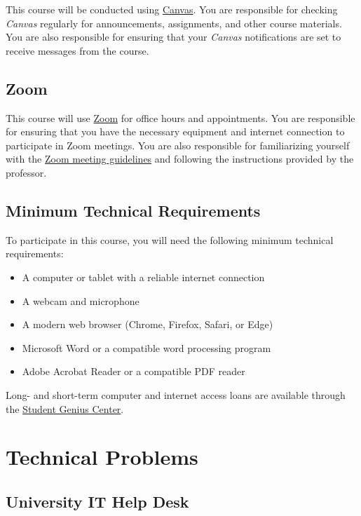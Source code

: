 \documentclass[11pt, letterpaper]{article}
\begin{document}
This course will be conducted using \href{https://csufullerton.instructure.com/}{Canvas}. You are responsible for checking \emph{Canvas} regularly for announcements, assignments, and other course materials. You are also responsible for ensuring that your \emph{Canvas} notifications are set to receive messages from the course. 

\subsection*{Zoom}
This course will use \href{https://fullerton.zoom.us/}{Zoom} for office hours and appointments. You are responsible for ensuring that you have the necessary equipment and internet connection to participate in Zoom meetings. You are also responsible for familiarizing yourself with the \href{https://support.zoom.us/hc/en-us/articles/201362193-Joining-a-Meeting}{Zoom meeting guidelines} and following the instructions provided by the professor.

\subsection*{Minimum Technical Requirements}

To participate in this course, you will need the following minimum technical requirements:
\begin{itemize}
    \item A computer or tablet with a reliable internet connection
    \item A webcam and microphone
    \item A modern web browser (Chrome, Firefox, Safari, or Edge)
    \item Microsoft Word or a compatible word processing program
    \item Adobe Acrobat Reader or a compatible PDF reader
\end{itemize}

\noindent Long- and short-term computer and internet access loans are available through the \href{http://www.fullerton.edu/it/students/sgc/index.php}{Student Genius Center}.

\section{Technical Problems}

\subsection*{University IT Help Desk}
\end{document}

